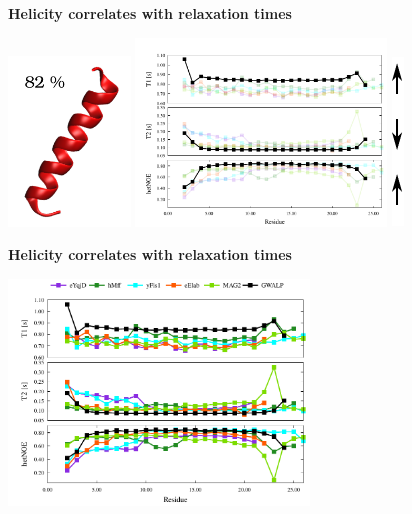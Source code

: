 \addtocounter{framenumber}{-1}
\begin{frame}
\LARGE{\centering
\textbf{Helicity correlates with relaxation times} \\}
\begin{center}
 \includegraphics[height=4.5cm]{plots/helix6.pdf}
 \includegraphics[height=5cm]{plots/simul_helix16.pdf}
 \includegraphics[height=4.5cm]{plots/arrows.pdf}
\end{center}

\end{frame}


\addtocounter{framenumber}{-1}
\begin{frame}
\LARGE{\centering
\textbf{Helicity correlates with relaxation times} \\}
\begin{center}
 \includegraphics[height=6cm]{plots/simul_helix_all.pdf}
\end{center}

\end{frame}


